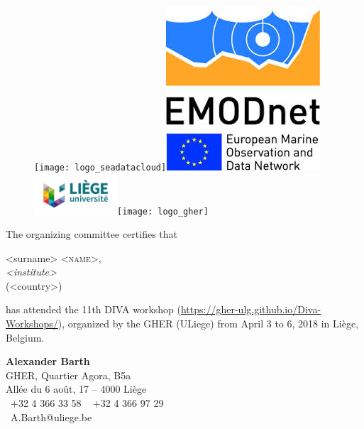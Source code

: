 \documentclass[12pt,svgnames,a4paper]{article}
\begin{document}
 
\thispagestyle{empty}
\large

\begin{figure}
\centering
\texttt{[image: logo\_seadatacloud]}\hspace*{.5cm}\includegraphics[width=.07\paperwidth]{logo_emodnet}\hspace*{.5cm}\includegraphics[height=1.5cm]{logo_uliege}\hspace*{.5cm}\texttt{[image: logo\_gher]}
\end{figure}


\vspace*{\fill}

 
The organizing committee certifies that

\vspace{1cm}

\begin{center}
\parbox{.8\textwidth}{
<surname> \textsc{<name>},\\
\textit{<institute>}\\
(<country>)
}
\end{center}

\vspace{1cm}

has attended the 11th \textsf{DIVA} workshop (\url{https://gher-ulg.github.io/Diva-Workshops/}), organized by the GHER (ULiege) from April 3 to 6, 2018 in Liège, Belgium.


\vspace{\fill}


\vspace*{1cm}


\begin{center}
\textbf{Alexander Barth}					\\
GHER, Quartier Agora, B5a							\\
All\'{e}e du 6 ao\^{u}t, 17 --  4000 Li\`{e}ge	 	\\
\Telefon~+32 4 366 33 58 \hspace{.5cm}  \Faxmachine~ +32 4 366 97 29 \\
\Letter~A.Barth@uliege.be
\end{center}
\end{document}
